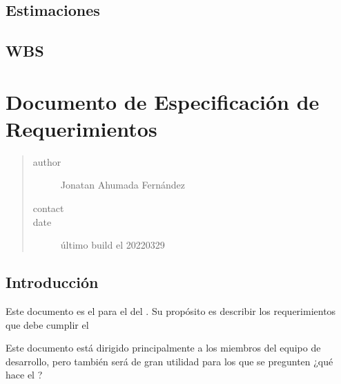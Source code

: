 \documentclass[letterpaper,10pt,spanish]{sphinxmanual}
\begin{document}
\section{Estimaciones}
\label{\detokenize{requerimientos/documento_proyecto:estimaciones}}


\section{WBS}
\label{\detokenize{requerimientos/documento_proyecto:wbs}}


\chapter{Documento de Especificación de Requerimientos}
\label{\detokenize{requerimientos/srs:documento-de-especificacion-de-requerimientos}}\label{\detokenize{requerimientos/srs::doc}}\begin{quote}\begin{description}
\item[{author}] \leavevmode
Jonatan Ahumada Fernández

\item[{contact}] \leavevmode
{}

\item[{date}] \leavevmode
último build el 2022\sphinxhyphen{}03\sphinxhyphen{}29

\end{description}\end{quote}


\section{Introducción}
\label{\detokenize{requerimientos/srs:introduccion}}
Este documento es el  para el  del
. Su propósito
es describir los requerimientos que debe cumplir el 

Este documento está dirigido principalmente a los miembros del equipo
de desarrollo, pero también será de gran utilidad para los 
que se pregunten ¿qué hace el ?
\end{document}
